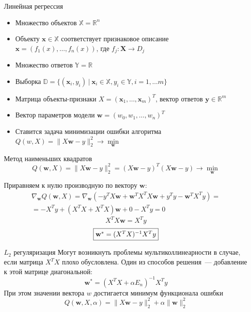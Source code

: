 \documentclass{beamer} %
\newcommand{\R}{\mathbb{R}}
\begin{document}
    \begin{frame}{Линейная регрессия}
        \begin{itemize}
            \item Множество объектов $\mathds{X} = \R^n$
            \item Объекту $\mathbf{x} \in \mathds{X}$ соответствует признаковое описание $\mathbf{x} = (f_1(x), \ldots, f_n(x))$,
            где $f_j: \mathbf{X} \to D_j$ 
            \item Множество ответов $\mathds{Y} = \R$
            \item Выборка $\mathds{D} = \{ (\mathbf{x}_i, y_i) \ | \ \mathbf{x}_i \in \mathds{X}, y_i \in \mathds{Y}, i = 1, \ldots m \}$
            \item Матрица объекты-признаки $X = (\mathbf{x}_1, \ldots, \mathbf{x}_m)^T$, вектор ответов $\mathbf{y} \in \R^m$
            \item Вектор параметров модели $\mathbf{w} = (w_0, w_1, \ldots, w_n)^T$
            \item Ставится задача минимизации ошибки алгоритма $Q(w, X) = \lVert X \mathbf{w} - y \rVert_2^2 \to \min\limits_{\mathbf{w}}$
        \end{itemize}
    \end{frame}

    \begin{frame}{Метод наименьших квадратов}
        \[ Q(\mathbf{w}, X) = \lVert X \mathbf{w} - y \rVert_2^2 = (X \mathbf{w} - y)^T (X \mathbf{w} - y) \to \min\limits_{\mathbf{w}} \]

        Приравняем к нулю производную по вектору $\mathbf{w}$:
        \begin{multline*}
            \nabla_{\mathbf{w}} Q(\mathbf{w}, X) = \nabla_{\mathbf{w}}(-y^T X \mathbf{w} + \mathbf{w}^T X^T X \mathbf{w} + y^T y - \mathbf{w}^T X^T y) = \\ 
            = - X^T y + (X^T X + X^T X) \mathbf{w} + 0 - X^T y = 0
        \end{multline*}
        \[ X^T X \mathbf{w} = X^T y \]
        \[ \fbox{$\mathbf{w}^* = (X^T X)^{-1} X^T y$} \]

    \end{frame}

    \begin{frame}{$L_2$ регуляризация}
        Могут возникнуть проблемы мультиколлинеарности в случае, если матрица $X^T X$ плохо обусловлена.
        Один из способов решения~--- добавление к этой матрице диагональной:
        \[ \mathbf{w}^* = (X^T X + \alpha E_n)^{-1} X^T y \]
        При этом значении вектора $w$ достигается минимум функционала ошибки
        \[ Q(\mathbf{w}, X, \alpha) = \lVert X \mathbf{w} - y \rVert_2^2 + \alpha \lVert \mathbf{w} \rVert_2^2 \]
    \end{frame}
\end{document}
